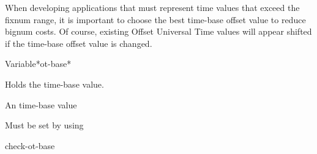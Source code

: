 \documentclass[10pt,twoside,english,pdftex]{article}
\begin{document}
When developing applications that must represent time values that
exceed the fixnum range, it is important to choose the best time-base
offset value to reduce bignum costs.  Of course, existing Offset
Universal Time values will appear shifted if the time-base offset
value is changed.

\W\entities
\T\clearpage


\begin{functiondoc}{Variable}{*ot-base*}{}%

\fnsyntax

\fnpurpose Holds the  time-base value.

\fnpackage {} 

\fnmodule {}

\fnvaluetype An  time-base value

\fninitialvalue Must be set by using 

\begin{alsos}{check-ot-base}
\also[ot2ut]
\also[ut2ot]
\end{alsos}

\end{functiondoc}

\end{document}
